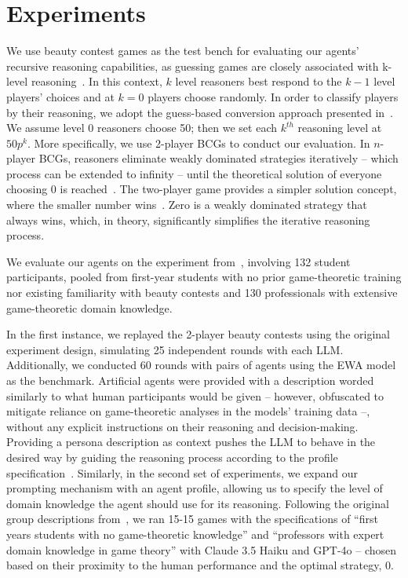 \documentclass[runningheads]{llncs}
\begin{document}
\section{Experiments}

We use beauty contest games as the test bench for evaluating our agents' recursive reasoning capabilities, as guessing games are closely associated with k-level reasoning~\cite{camerer2004cognitive}. In this context, $k$ level reasoners best respond to the $k-1$ level players' choices and at $k=0$ players choose randomly. In order to classify players by their reasoning, we adopt the guess-based conversion approach presented in~\cite{nagel95}. We assume level 0 reasoners choose 50; then we set each $k^{th}$ reasoning level at $50p^k$.
More specifically, we use 2-player BCGs to conduct our evaluation. In $n$-player BCGs, reasoners eliminate weakly dominated strategies iteratively -- which process can be extended to infinity -- until the theoretical solution of everyone choosing 0 is reached~\cite{camerer2004cognitive}. The two-player game provides a simpler solution concept, where the smaller number wins~\cite{nagel08}. Zero is a weakly dominated strategy that always wins, which, in theory, significantly simplifies the iterative reasoning process.

We evaluate our agents on the experiment from~\cite{nagel08}, involving 132 student participants, pooled from first-year students with no prior game-theoretic training nor existing familiarity with beauty contests and 130 professionals with extensive game-theoretic domain knowledge.

In the first instance, we replayed the 2-player beauty contests using the original experiment design, simulating 25 independent rounds with each LLM. Additionally, we conducted 60 rounds with pairs of agents using the EWA model as the benchmark. Artificial agents were provided with a description worded similarly to what human participants would be given -- however, obfuscated to mitigate reliance on game-theoretic analyses in the models' training data --, without any explicit instructions on their reasoning and decision-making. Providing a persona description as context pushes the LLM to behave in the desired way by guiding the reasoning process according to the profile specification~\cite{mao2024alympicsllmagentsmeet}. Similarly, in the second set of experiments, we expand our prompting mechanism with an agent profile, allowing us to specify the level of domain knowledge the agent should use for its reasoning. Following the original group descriptions from~\cite{nagel08}, we ran 15-15 games with the specifications of ``first years students with no game-theoretic knowledge'' and ``professors with expert domain knowledge in game theory'' with Claude 3.5 Haiku and GPT-4o -- chosen based on their proximity to the human performance and the optimal strategy, 0.
\end{document}
